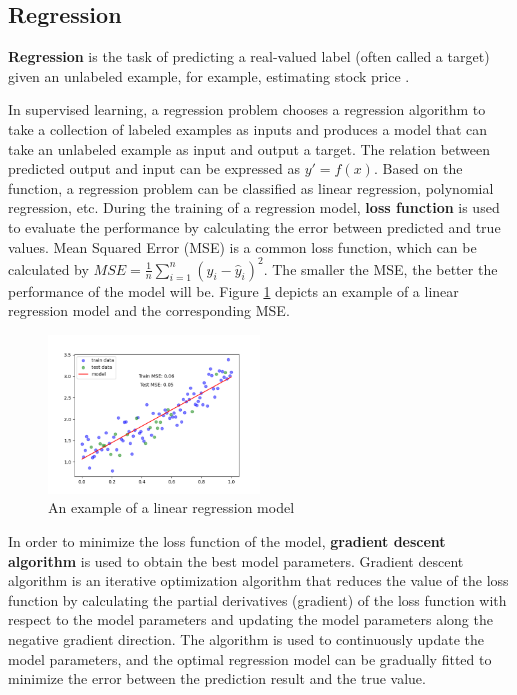 \subsection{Regression}

\textbf{Regression} is the task of predicting a real-valued label (often called a target) given an unlabeled example, for example, estimating stock price \cite{burkov2019hundred}.

In supervised learning, a regression problem chooses a regression algorithm to take a collection of labeled examples as inputs and produces a model that can take an unlabeled example as input and output a target. The relation between predicted output and input can be expressed as $ y' = f (x) $. Based on the function, a regression problem can be classified as linear regression, polynomial regression, etc. During the training of a regression model, \textbf{loss function} is used to evaluate the performance by calculating the error between predicted and true values. Mean Squared Error (MSE) is a common loss function, which can be calculated by $ MSE = \frac{1}{n}\sum_{i=1}^{n}(y_i - \hat{y}_i)^2$. The smaller the MSE, the better the performance of the model will be. Figure \ref{fig:5} depicts an example of a linear regression model and the corresponding MSE.

\begin{figure}[h]
  \centering
\includegraphics[width=0.5\textwidth]{Figures/Linear Regression.png}
  \caption{An example of a linear regression model}
  \label{fig:5}
\end{figure}

In order to minimize the loss function of the model, \textbf{gradient descent algorithm} is used to obtain the best model parameters. Gradient descent algorithm is an iterative optimization algorithm that reduces the value of the loss function by calculating the partial derivatives (gradient) of the loss function with respect to the model parameters and updating the model parameters along the negative gradient direction. The algorithm is used to continuously update the model parameters, and the optimal regression model can be gradually fitted to minimize the error between the prediction result and the true value.

